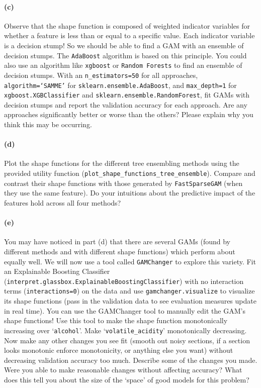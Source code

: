 \documentclass{exam}
\begin{document}
\paragraph{(c)} Observe that the shape function is composed of weighted indicator variables for whether a feature is less than or equal to a specific value. Each indicator variable is a decision stump! So we should be able to find a GAM with an ensemble of decision stumps. The \texttt{AdaBoost} algorithm is based on this principle. You could also use an algorithm like \texttt{xgboost} or \texttt{Random Forests} to find an ensemble of decision stumps. With an \texttt{n\_estimators=50} for all approaches, \texttt{algorithm=`SAMME'} for \texttt{sklearn.ensemble.AdaBoost}, and \texttt{max\_depth=1} for \texttt{xgboost.XGBClassifier} and \texttt{sklearn.ensemble.RandomForest}, fit GAMs with decision stumps and report the validation accuracy for each approach. Are any approaches significantly better or worse than the others? Please explain why you think this may be occurring.


\paragraph{(d)} Plot the shape functions for the different tree ensembling methods using the provided utility function (\texttt{plot\_shape\_functions\_tree\_ensemble}). Compare and contrast their shape functions with those generated by \texttt{FastSparseGAM} (when they use the same feature). Do your intuitions about the predictive impact of the features hold across all four methods? 


\paragraph{(e)} You may have noticed in part (d) that there are several GAMs (found by different methods and with different shape functions) which perform about equally well. We will now use a tool called \texttt{GAMChanger} to explore this variety. Fit an Explainable Boosting Classifier (\texttt{interpret.glassbox.ExplainableBoostingClassifier}) with no interaction terms (\texttt{interactions=0}) on the data and use \texttt{gamchanger.visualize} to visualize its shape functions (pass in the validation data to see evaluation measures update in real time). You can use the GAMChanger tool to manually edit the GAM's shape functions! Use this tool to make the shape function monotonically increasing over `\texttt{alcohol}'. Make `\texttt{volatile\_acidity}' monotonically decreasing. 
Now make any other changes you see fit (smooth out noisy sections, if a section looks monotonic enforce monotonicity, or anything else you want) without decreasing validation accuracy too much. Describe some of the changes you made. Were you able to make reasonable changes without affecting accuracy? What does this tell you about the size of the `space' of good models for this problem?



\color{black}
\end{document}

